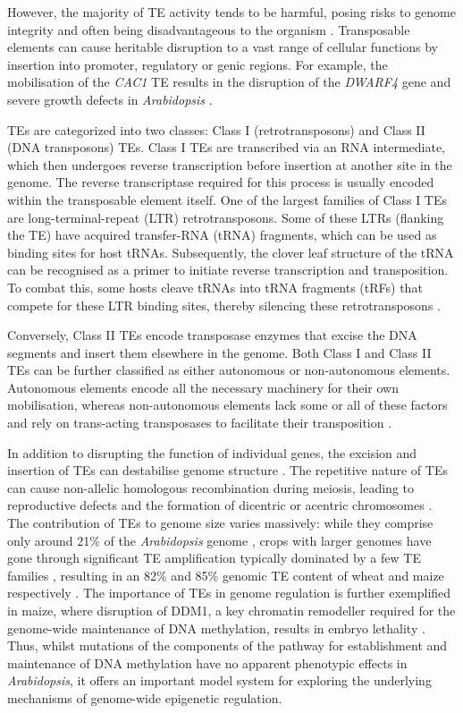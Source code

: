 However, the majority of TE activity tends to be harmful, posing risks to genome integrity and often being disadvantageous to the organism \cite{RN103}. Transposable elements can cause heritable disruption to a vast range of cellular functions by insertion into promoter, regulatory or genic regions. For example, the mobilisation of the \textit{CAC1} TE results in the disruption of the \textit{DWARF4}  gene and severe growth defects in \textit{Arabidopsis} \cite{RN105}.

TEs are categorized into two classes: Class I (retrotransposons) and Class II (DNA transposons) TEs. Class I TEs are transcribed via an RNA intermediate, which then undergoes reverse transcription before insertion at another site in the genome. The reverse transcriptase required for this process is usually encoded within the transposable element itself. One of the largest families of Class I TEs are long-terminal-repeat (LTR) retrotransposons. Some of these LTRs (flanking the TE) have acquired transfer-RNA (tRNA) fragments, which can be used as binding sites for host tRNAs. Subsequently, the clover leaf structure of the tRNA can be recognised as a primer to initiate reverse transcription and transposition. To combat this, some hosts cleave tRNAs into tRNA fragments (tRFs) that compete for these LTR binding sites, thereby silencing these retrotransposons \cite{RN66,RN67,RN68}.

Conversely, Class II TEs encode transposase enzymes that excise the DNA segments and insert them elsewhere in the genome.  Both Class I and Class II TEs can be further classified as either autonomous or non-autonomous elements. Autonomous elements encode all the necessary machinery for their own mobilisation, whereas non-autonomous elements lack some or all of these factors and rely on trans-acting transposases to facilitate their transposition \cite{RN106,RN107}.

In addition to disrupting the function of individual genes, the excision and insertion of TEs can destabilise genome structure \cite{RN103}. The repetitive nature of TEs can cause non-allelic homologous recombination during meiosis, leading to reproductive defects and the formation of dicentric or acentric chromosomes \cite{RN108}. The contribution of TEs to genome size varies massively: while they comprise only around 21\% of the \textit{Arabidopsis} genome \cite{RN109},  crops with larger genomes have gone through significant TE amplification typically dominated by a few TE families \cite{RN110,RN113}, resulting in an 82\% and 85\% genomic TE content of wheat and maize respectively \cite{RN110,RN111}. The importance of TEs in genome regulation is further exemplified in maize, where disruption of DDM1, a key chromatin remodeller required for the genome-wide maintenance of DNA methylation, results in embryo lethality \cite{RN112}. Thus, whilst mutations of the components of the pathway for establishment and maintenance of DNA methylation have no apparent phenotypic effects in \textit{Arabidopsis}, it offers an important model system for exploring the underlying mechanisms of genome-wide epigenetic regulation.

